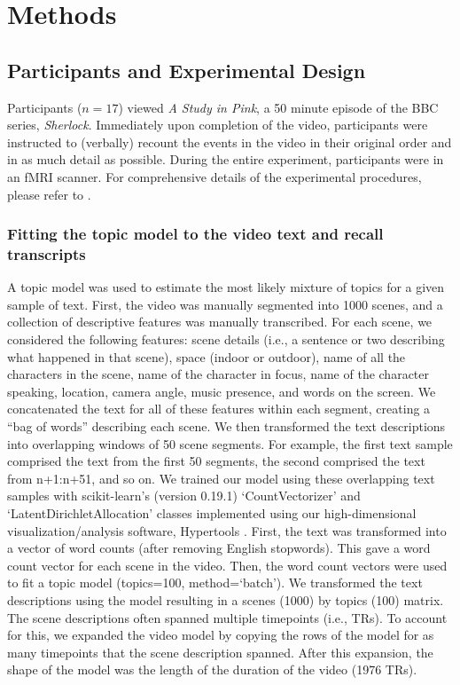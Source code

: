 \documentclass{article}
\begin{document}
\pagebreak


\pagebreak
\section*{Methods}
\label{sec:methods}

\subsection{Participants and Experimental Design}
Participants ($n=17$) viewed \textit{A Study in Pink}, a 50 minute episode of the BBC series, \textit{Sherlock}. Immediately upon completion of the video, participants were instructed to (verbally) recount the events in the video in their original order and in as much detail as possible. During the entire experiment, participants were in an fMRI scanner. For comprehensive details of the experimental procedures, please refer to \cite{ChenEtal17}.

\subsubsection{Fitting the topic model to the video text and recall transcripts}
A topic model was used to estimate the most likely mixture of topics for a given sample of text. First, the video was manually segmented into 1000 scenes, and a collection of descriptive features was manually transcribed. For each scene, we considered the following features: scene details (i.e., a sentence or two describing what happened in that scene), space (indoor or outdoor), name of all the characters in the scene, name of the character in focus, name of the character speaking, location, camera angle, music presence, and words on the screen. We concatenated the text for all of these features within each segment, creating a ``bag of words'' describing each scene. We then transformed the text descriptions into overlapping windows of 50 scene segments. For example, the first text sample comprised the text from the first 50 segments, the second comprised the text from n+1:n+51, and so on. We trained our model using these overlapping text samples with scikit-learn's (version 0.19.1) `CountVectorizer' and `LatentDirichletAllocation' classes \citep{PedrEtal11} implemented using our high-dimensional visualization/analysis software, Hypertools \citep{HeusEtal17a}.  First, the text was transformed into a vector of word counts (after removing English stopwords). This gave a word count vector for each scene in the video.  Then, the word count vectors were used to fit a topic model (topics=100, method=`batch'). We transformed the text descriptions using the model resulting in a scenes (1000) by topics (100) matrix. The scene descriptions often spanned multiple timepoints (i.e., TRs). To account for this, we expanded the video model by copying the rows of the model for as many timepoints that the scene description spanned. After this expansion, the shape of the model was the length of the duration of the video (1976 TRs).
\end{document}
